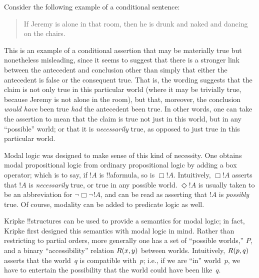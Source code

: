 \documentclass[../../../include/open-logic-section]{subfiles}
\begin{document}


Consider the following example of a conditional sentence:
\begin{quote}
  If Jeremy is alone in that room, then he is drunk and naked and
  dancing on the chairs.
\end{quote}
This is an example of a conditional assertion that may be materially
true but nonetheless misleading, since it seems to suggest that there
is a stronger link between the antecedent and conclusion other than
simply that either the antecedent is false or the consequent
true. That is, the wording suggests that the claim is not only true in
this particular world (where it may be trivially true, because Jeremy
is not alone in the room), but that, moreover, the conclusion
\emph{would have} been true \emph{had} the antecedent been true. In
other words, one can take the assertion to mean that the claim is true
not just in this world, but in any ``possible'' world; or that it is
\emph{necessarily} true, as opposed to just true in this particular
world.

Modal logic was designed to make sense of this kind of necessity. One
obtains modal propositional logic from ordinary
propositional logic by adding a box operator; which is to say, if
$!A$ is !!a{formula}, so is $\Box !A$.  Intuitively, $\Box !A$
asserts that $!A$ is \emph{necessarily} true, or true in any possible
world. $\Diamond !A$ is usually taken to be an abbreviation for
$\lnot \Box \lnot !A$, and can be read as asserting that $!A$ is
\emph{possibly} true. Of course, modality can be added to predicate
logic as well.

Kripke !!{structure}s can be used to provide a semantics for modal
logic; in fact, Kripke first designed this semantics with modal logic
in mind. Rather than restricting to partial orders, more generally one
has a set of ``possible worlds,'' $P$, and a binary ``accessibility''
relation $\mathord{R}(x,y)$ between worlds. Intuitively, $\mathord{R}(p,q)$
asserts that the world~$q$ is compatible with~$p$; i.e., if we are
``in'' world~$p$, we have to entertain the possibility that the
world could have been like~$q$.
\end{document}
